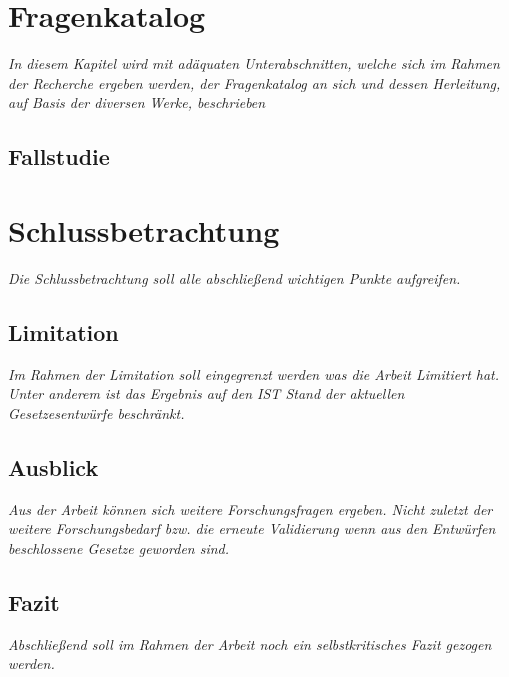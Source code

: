\documentclass[11pt,a4paper,hidelinks]{article}   %
\begin{document}
    \section{Fragenkatalog}\label{sec:HerleitungDesFragenkatalog}
        \emph{In diesem Kapitel wird mit adäquaten Unterabschnitten, welche sich im Rahmen der Recherche ergeben werden, der Fragenkatalog an sich und dessen Herleitung, auf Basis der diversen Werke, beschrieben}
        
        \subsection{Fallstudie}


    \newpage
    \section{Schlussbetrachtung}
        \emph{Die Schlussbetrachtung soll alle abschließend wichtigen Punkte aufgreifen.}
        \subsection{Limitation}
        \emph{Im Rahmen der Limitation soll eingegrenzt werden was die Arbeit Limitiert hat. Unter anderem ist das Ergebnis auf den IST Stand der aktuellen Gesetzesentwürfe beschränkt.}
        \subsection{Ausblick}
        \emph{Aus der Arbeit können sich weitere Forschungsfragen ergeben. Nicht zuletzt der weitere Forschungsbedarf bzw. die erneute Validierung wenn aus den Entwürfen beschlossene Gesetze geworden sind.}
        \subsection{Fazit}
        \emph{Abschließend soll im Rahmen der Arbeit noch ein selbstkritisches Fazit gezogen werden.}

    \newpage
    \printbibliography
\end{document}
